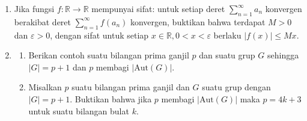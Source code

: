 \documentclass[12pt,twoside]{article}
\begin{document}
\begin{enumerate}
    \item Jika fungsi $f : \mathbb{R} \to \mathbb{R}$ mempunyai sifat: untuk setiap deret $\displaystyle\sum_{n=1}^{\infty} a_n$ konvergen berakibat deret $\displaystyle\sum_{n=1}^{\infty} f(a_n)$ konvergen, buktikan bahwa terdapat $M>0$ dan $\varepsilon>0$, dengan sifat untuk setiap $x\in\mathbb{R}, 0 < x < \varepsilon$ berlaku $\left| f(x) \right| \leq Mx$.
    \item \begin{enumerate}
              \item[(a)] Berikan contoh suatu bilangan prima ganjil $p$ dan suatu grup $G$ sehingga $|G|=p+1$ dan $p$ membagi $|\text{Aut}(G)|.$
              \item[(b)] Misalkan $p$ suatu bilangan prima ganjil dan $G$ suatu grup dengan $|G| = p+1$. Buktikan bahwa jika $p$ membagi $|\text{Aut}(G)|$ maka $p=4k+3$ untuk suatu bilangan bulat $k$.
          \end{enumerate}
\end{enumerate}
\end{document}
